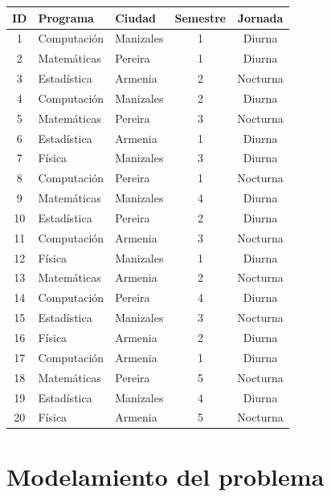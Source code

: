 \documentclass[12pt, a4paper]{article}
\begin{document}
\begin{center}
\small
\begin{tabular}{cllcc}
  \toprule
  \textbf{ID} & \textbf{Programa} & \textbf{Ciudad} & \textbf{Semestre} & \textbf{Jornada} \\
  \midrule
   1 & Computación  & Manizales & 1 & Diurna   \\
   2 & Matemáticas  & Pereira   & 1 & Diurna   \\
   3 & Estadística  & Armenia   & 2 & Nocturna \\
   4 & Computación  & Manizales & 2 & Diurna   \\
   5 & Matemáticas  & Pereira   & 3 & Nocturna \\
   6 & Estadística  & Armenia   & 1 & Diurna   \\
   7 & Física       & Manizales & 3 & Diurna   \\
   8 & Computación  & Pereira   & 1 & Nocturna \\
   9 & Matemáticas  & Manizales & 4 & Diurna   \\
  10 & Estadística  & Pereira   & 2 & Diurna   \\
  11 & Computación  & Armenia   & 3 & Nocturna \\
  12 & Física       & Manizales & 1 & Diurna   \\
  13 & Matemáticas  & Armenia   & 2 & Nocturna \\
  14 & Computación  & Pereira   & 4 & Diurna   \\
  15 & Estadística  & Manizales & 3 & Nocturna \\
  16 & Física       & Armenia   & 2 & Diurna   \\
  17 & Computación  & Armenia   & 1 & Diurna   \\
  18 & Matemáticas  & Pereira   & 5 & Nocturna \\
  19 & Estadística  & Manizales & 4 & Diurna   \\
  20 & Física       & Armenia   & 5 & Nocturna \\
  \bottomrule
\end{tabular}
\end{center}

\section{Modelamiento del problema}
\end{document}
